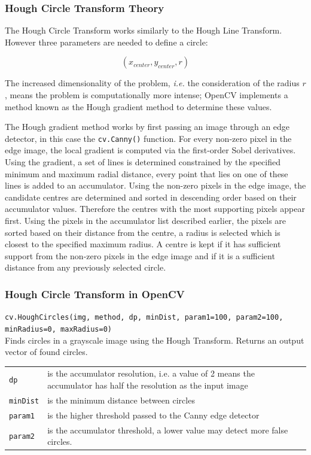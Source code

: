 \documentclass{article}
\theoremstyle{definition}
\theoremstyle{remark}
\newcommand{\func}[2]{\noindent\lstinline{#1}\\#2}
\begin{document}
\subsubsection{Hough Circle Transform Theory}

The Hough Circle Transform works similarly to the Hough Line Transform. However three parameters are needed to define a circle: 

\begin{equation*}
 (x_{center}, y_{center}, r) 
\end{equation*}

\noindent The increased dimensionality of the problem, \textit{i.e.} the consideration of the radius $ r $, means the problem is computationally more intense; OpenCV implements a method known as the Hough gradient method to determine these values.

The Hough gradient method works by first passing an image through an edge detector, in this case the \lstinline{cv.Canny()} function. For every non-zero pixel in the edge image, the local gradient is computed via the first-order Sobel derivatives. Using the gradient, a set of lines is determined constrained by the specified minimum and maximum radial distance, every point that lies on one of these lines is added to an accumulator. Using the non-zero pixels in the edge image, the candidate centres are determined and sorted in descending order based on their accumulator values. Therefore the centres with the most supporting pixels appear first. Using the pixels in the accumulator list described earlier, the pixels are sorted based on their distance from the centre, a radius is selected which is closest to the specified maximum radius. A centre is kept if it has sufficient support from the non-zero pixels in the edge image and if it is a sufficient distance from any previously selected circle.

\subsubsection{Hough Circle Transform in OpenCV}

\func{cv.HoughCircles(img, method, dp, minDist, param1=100, param2=100, minRadius=0, maxRadius=0)}{
    Finds circles in a grayscale image using the Hough Transform. Returns an output vector of found circles.\\ 
    \begin{tabular}{ p{2cm} p{10cm} }
	\indent\lstinline{dp} & is the accumulator resolution, i.e. a value of 2 means the accumulator has half the resolution as the input image\\
	\indent\lstinline{minDist} & is the minimum distance between circles\\ 
	\indent\lstinline{param1} & is the higher threshold passed to the Canny edge detector\\ 
	\indent\lstinline{param2} & is the accumulator threshold, a lower value may detect more false circles.
    \end{tabular}
}
\end{document}
